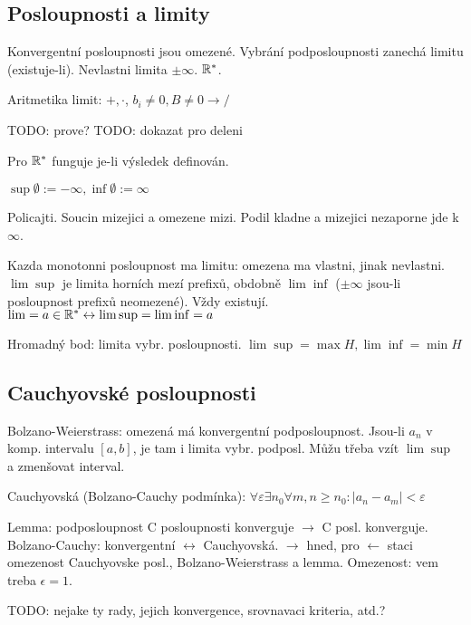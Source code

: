 
\subsection{Posloupnosti a limity}
Konvergentní posloupnosti jsou omezené.
Vybrání podposloupnosti zanechá limitu (existuje-li).
Nevlastni limita $\pm\infty$. $\mathbb{R}^*$.

Aritmetika limit: $+,\cdot$, $b_i\neq 0,B\neq 0\rightarrow/$

TODO: prove?
TODO: dokazat pro deleni

Pro $\mathbb{R}^*$ funguje je-li výsledek definován.

$\sup\emptyset:=-\infty,\inf\emptyset:=\infty$

Policajti. Soucin mizejici a omezene mizi.
Podil kladne a mizejici nezaporne jde k $\infty$.

Kazda monotonni posloupnost ma limitu: omezena ma vlastni, jinak nevlastni.
$\lim\sup$ je limita horních mezí prefixů, obdobně $\lim\inf$ ($\pm\infty$
jsou-li posloupnost prefixů neomezené). Vždy existují.
$\lim=a\in\mathbb{R}^*\leftrightarrow\lim\sup=\lim\inf=a$

Hromadný bod: limita vybr. posloupnosti. $\lim\sup=\max H,\lim\inf=\min H$

\subsection{Cauchyovské posloupnosti}
Bolzano-Weierstrass: omezená má konvergentní podposloupnost.
Jsou-li $a_n$ v komp. intervalu $[a,b]$, je tam i limita vybr. podposl.
Můžu třeba vzít $\lim\sup$ a zmenšovat interval.

Cauchyovská (Bolzano-Cauchy podmínka):
$\forall\varepsilon\exists n_0\forall m,n\geq n_0: |a_n-a_m|<\varepsilon$

Lemma: podposloupnost C posloupnosti konverguje $\rightarrow$ C posl.
konverguje.
Bolzano-Cauchy: konvergentní $\leftrightarrow$ Cauchyovská. $\rightarrow$
hned, pro $\leftarrow$ staci omezenost Cauchyovske posl., Bolzano-Weierstrass
a lemma. Omezenost: vem treba $\epsilon=1$.

TODO: nejake ty rady, jejich konvergence, srovnavaci kriteria, atd.?

